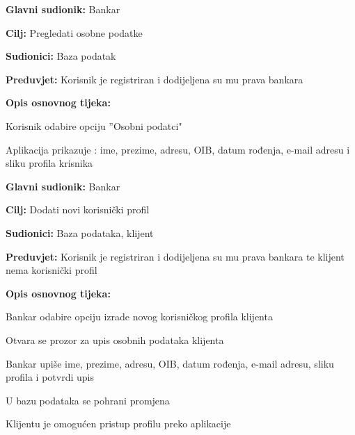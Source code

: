 		
			\noindent {}
			\begin{packed_item}
				
				\item \textbf{Glavni sudionik: }Bankar
				\item  \textbf{Cilj:} Pregledati osobne podatke
				\item  \textbf{Sudionici:} Baza podatak
				\item  \textbf{Preduvjet:} Korisnik je registriran i dodijeljena su mu prava bankara 
				\item  \textbf{Opis osnovnog tijeka:}
				
				\item[] \begin{packed_enum}
					
					\item  Korisnik odabire opciju ”Osobni podatci"
					\item  Aplikacija prikazuje : ime, prezime, adresu, OIB, datum rođenja, e-mail adresu i sliku profila krisnika
				\end{packed_enum}
				
			\end{packed_item}
            		
          
          
            \noindent {}
            \begin{packed_item}
                
                  \item \textbf{Glavni sudionik: }Bankar
                  \item  \textbf{Cilj:} Dodati novi korisnički profil
                  \item  \textbf{Sudionici:} Baza podataka, klijent
                  \item  \textbf{Preduvjet:} Korisnik je registriran i dodijeljena su mu prava bankara te klijent nema korisnički profil
                  \item  \textbf{Opis osnovnog tijeka:}
                  
                  \item[] \begin{packed_enum}
                
                    \item  Bankar odabire opciju izrade novog korisničkog profila klijenta
                    \item  Otvara se prozor za upis osobnih podataka klijenta
                    \item  Bankar upiše ime, prezime, adresu, OIB, datum rođenja, e-mail adresu, sliku profila i potvrdi upis
                    \item  U bazu podataka se pohrani promjena
                    \item  Klijentu je omogućen pristup profilu preko aplikacije                                  
                  \end{packed_enum}
                  
                \end{packed_item}
            
